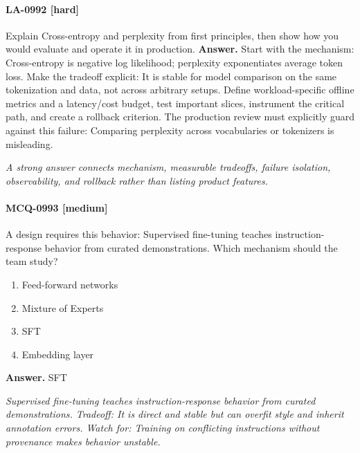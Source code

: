 \paragraph{LA-0992 [hard]} Explain Cross-entropy and perplexity from first principles, then show how you would evaluate and operate it in production.
\noindent\textbf{Answer.} Start with the mechanism: Cross-entropy is negative log likelihood; perplexity exponentiates average token loss. Make the tradeoff explicit: It is stable for model comparison on the same tokenization and data, not across arbitrary setups. Define workload-specific offline metrics and a latency/cost budget, test important slices, instrument the critical path, and create a rollback criterion. The production review must explicitly guard against this failure: Comparing perplexity across vocabularies or tokenizers is misleading.
\par\textit{A strong answer connects mechanism, measurable tradeoffs, failure isolation, observability, and rollback rather than listing product features.}
\paragraph{MCQ-0993 [medium]} A design requires this behavior: Supervised fine-tuning teaches instruction-response behavior from curated demonstrations. Which mechanism should the team study?
\begin{enumerate}[label=\Alph*.]
\item Feed-forward networks
\item Mixture of Experts
\item SFT
\item Embedding layer
\end{enumerate}
\noindent\textbf{Answer.} SFT
\par\textit{Supervised fine-tuning teaches instruction-response behavior from curated demonstrations. Tradeoff: It is direct and stable but can overfit style and inherit annotation errors. Watch for: Training on conflicting instructions without provenance makes behavior unstable.}
